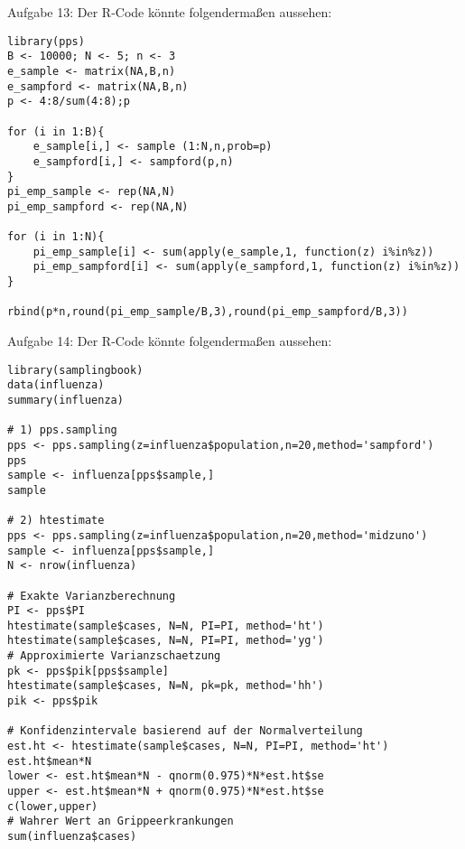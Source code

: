 \begin{Solution}{{Aufgabe 13:}}
Der R-Code könnte folgendermaßen aussehen:
\begin{lstlisting}
library(pps)
B <- 10000; N <- 5; n <- 3
e_sample <- matrix(NA,B,n)
e_sampford <- matrix(NA,B,n)
p <- 4:8/sum(4:8);p

for (i in 1:B){
	e_sample[i,] <- sample (1:N,n,prob=p)
	e_sampford[i,] <- sampford(p,n)
}
pi_emp_sample <- rep(NA,N)
pi_emp_sampford <- rep(NA,N)

for (i in 1:N){
	pi_emp_sample[i] <- sum(apply(e_sample,1, function(z) i%in%z))
	pi_emp_sampford[i] <- sum(apply(e_sampford,1, function(z) i%in%z))
}

rbind(p*n,round(pi_emp_sample/B,3),round(pi_emp_sampford/B,3))
\end{lstlisting}
\end{Solution}
\begin{Solution}{{Aufgabe 14:}}
Der R-Code könnte folgendermaßen aussehen:
\begin{lstlisting}
library(samplingbook)
data(influenza)
summary(influenza)

# 1) pps.sampling
pps <- pps.sampling(z=influenza$population,n=20,method='sampford')
pps
sample <- influenza[pps$sample,]
sample

# 2) htestimate
pps <- pps.sampling(z=influenza$population,n=20,method='midzuno')
sample <- influenza[pps$sample,]
N <- nrow(influenza)

# Exakte Varianzberechnung
PI <- pps$PI
htestimate(sample$cases, N=N, PI=PI, method='ht')
htestimate(sample$cases, N=N, PI=PI, method='yg')
# Approximierte Varianzschaetzung
pk <- pps$pik[pps$sample]
htestimate(sample$cases, N=N, pk=pk, method='hh')
pik <- pps$pik

# Konfidenzintervale basierend auf der Normalverteilung
est.ht <- htestimate(sample$cases, N=N, PI=PI, method='ht')
est.ht$mean*N
lower <- est.ht$mean*N - qnorm(0.975)*N*est.ht$se
upper <- est.ht$mean*N + qnorm(0.975)*N*est.ht$se
c(lower,upper)
# Wahrer Wert an Grippeerkrankungen
sum(influenza$cases)
\end{lstlisting}

\end{Solution}
